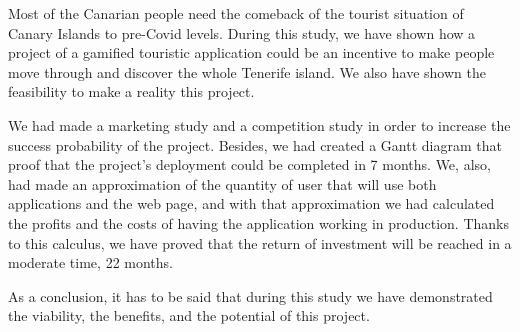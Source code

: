 Most of the Canarian people need the comeback of the tourist situation of Canary Islands to pre-Covid levels. 
During this study, we have shown how a project of a gamified touristic application could be an incentive to make people move through and discover the whole Tenerife island. We also have shown the feasibility to make a reality this project.

We had made a marketing study and a competition study in order to increase the success probability of the project. Besides, we had created a Gantt diagram that proof that the project's deployment could be completed in 7 months. We, also, had made an approximation of the quantity of user that will use both applications and the web page, and with that approximation we had calculated the profits and the costs of having the application working in production. Thanks to this calculus, we have proved that the return of investment will be reached in a moderate time, 22 months.

As a conclusion, it has to be said that during this study we have demonstrated the viability, the benefits, and the potential of this project.